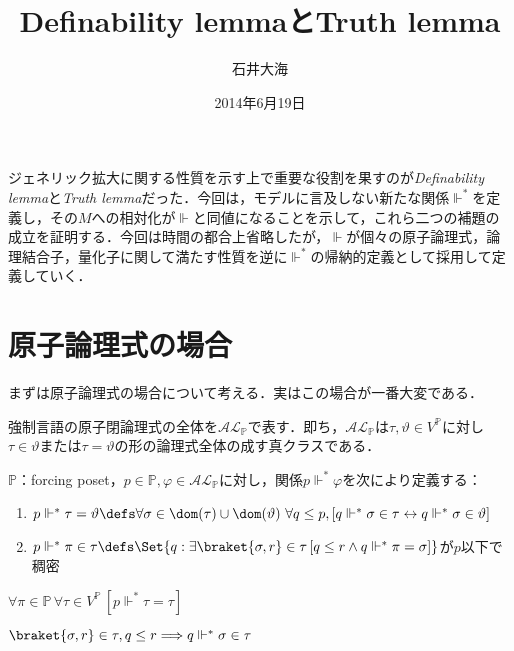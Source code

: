 \documentclass[a4j]{bxjsarticle}
\title{Definability lemmaとTruth lemma}
\author{石井大海}
\date{2014年6月19日}
\theoremstyle{definition}
\begin{document}
\maketitle
ジェネリック拡大に関する性質を示す上で重要な役割を果すのが\textit{Definability lemma}と\textit{Truth lemma}だった．今回は，モデルに言及しない新たな関係$\mathrel{\Vdash^*}$を定義し，その$M$への相対化が$\Vdash$と同値になることを示して，これら二つの補題の成立を証明する．今回は時間の都合上省略したが，$\Vdash$が個々の原子論理式，論理結合子，量化子に関して満たす性質を逆に$\mathrel{\Vdash^*}$の帰納的定義として採用して定義していく．

\section{原子論理式の場合}
まずは原子論理式の場合について考える．実はこの場合が一番大変である．

\begin{definition}
 強制言語の原子閉論理式の全体を$\mathcal{AL}_\mathbb{P}$で表す．即ち，$\mathcal{AL}_\mathbb{P}$は$\tau, \vartheta \in V^\mathbb{P}$に対し$\tau \in \vartheta$または$\tau = \vartheta$の形の論理式全体の成す真クラスである．
\end{definition}

\begin{definition}\label{def:force-atomic}
 $\mathbb{P}$：forcing poset，$p \in \mathbb{P}, \varphi \in \mathcal{AL}_\mathbb{P}$に対し，関係$p \mathrel{\Vdash^*} \varphi$を次により定義する：
 \begin{enumerate}
   \item $p \mathrel{\mathord\Vdash^*} \tau = \vartheta \defs \forall \sigma \in \dom(\tau) \cup \dom(\vartheta)\ \forall q \leq p ,[q \mathrel{\Vdash^*} \sigma \in \tau \leftrightarrow q \mathrel{\Vdash^*} \sigma \in \vartheta]$
  \item $p \mathrel{\Vdash^*} \pi \in \tau \defs \Set{ q : \exists \braket{\sigma, r} \in \tau \,[q \leq r \wedge q \mathrel{\Vdash^*} \pi = \sigma]}$が$p$以下で稠密
\end{enumerate}
\end{definition}

\begin{remark}\label{rem:q-forces-element}
 \begin{enumerate*}[label=(\alph*),itemjoin=\quad]
  \item $\forall \pi \in \mathbb{P}\,\forall \tau \in V^\mathbb{P} \, [p \mathrel{\Vdash^*} \tau = \tau]$
  \item $\braket{\sigma, r} \in \tau, q \leq r \Longrightarrow q \mathrel{\Vdash^*} \sigma \in \tau$
 \end{enumerate*}
\end{remark}
\end{document}
